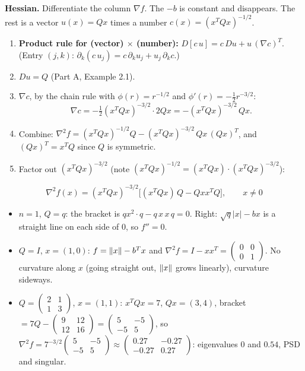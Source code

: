\textbf{Hessian.} Differentiate the column $\nabla f$. The $-b$ is constant and disappears. The rest is a vector $u(x)=Qx$ times a number $c(x)=(x^TQx)^{-1/2}$.
\begin{enumerate}
  \item \textbf{Product rule for (vector) $\times$ (number):} $D[c\,u]=c\,Du+u\,(\nabla c)^T$. (Entry $(j,k)$: $\partial_k(c\,u_j)=c\,\partial_ku_j+u_j\,\partial_kc$.)
  \item $Du=Q$ (Part A, Example 2.1).
  \item $\nabla c$, by the chain rule with $\phi(r)=r^{-1/2}$ and $\phi'(r)=-\tfrac12r^{-3/2}$:
        \[ \nabla c=-\tfrac12(x^TQx)^{-3/2}\cdot2Qx=-(x^TQx)^{-3/2}\,Qx. \]
  \item Combine: $\nabla^2f=(x^TQx)^{-1/2}Q-(x^TQx)^{-3/2}\,Qx\,(Qx)^T$, and $(Qx)^T=x^TQ$ since $Q$ is symmetric.
  \item Factor out $(x^TQx)^{-3/2}$ (note $(x^TQx)^{-1/2}=(x^TQx)\cdot(x^TQx)^{-3/2}$):
\end{enumerate}
\[ \boxed{\ \nabla^2f(x)=(x^TQx)^{-3/2}\Big[(x^TQx)\,Q-Qxx^TQ\Big],\qquad x\ne0\ } \]

\begin{example}
\begin{itemize}
  \item $n=1$, $Q=q$: the bracket is $qx^2\cdot q-q\,x\,x\,q=0$. Right: $\sqrt q|x|-bx$ is a straight line on each side of $0$, so $f''=0$.
  \item $Q=I$, $x=(1,0)$: $f=\lVert x\rVert-b^Tx$ and $\nabla^2f=I-xx^T=\begin{pmatrix}0&0\\0&1\end{pmatrix}$. No curvature along $x$ (going straight out, $\lVert x\rVert$ grows linearly), curvature sideways.
  \item $Q=\begin{pmatrix}2&1\\1&3\end{pmatrix}$, $x=(1,1)$: $x^TQx=7$, $Qx=(3,4)$, bracket $=7Q-\begin{pmatrix}9&12\\12&16\end{pmatrix}=\begin{pmatrix}5&-5\\-5&5\end{pmatrix}$,
        so $\nabla^2f=7^{-3/2}\begin{pmatrix}5&-5\\-5&5\end{pmatrix}\approx\begin{pmatrix}0.27&-0.27\\-0.27&0.27\end{pmatrix}$: eigenvalues $0$ and $0.54$, PSD and singular.
\end{itemize}
\end{example}


